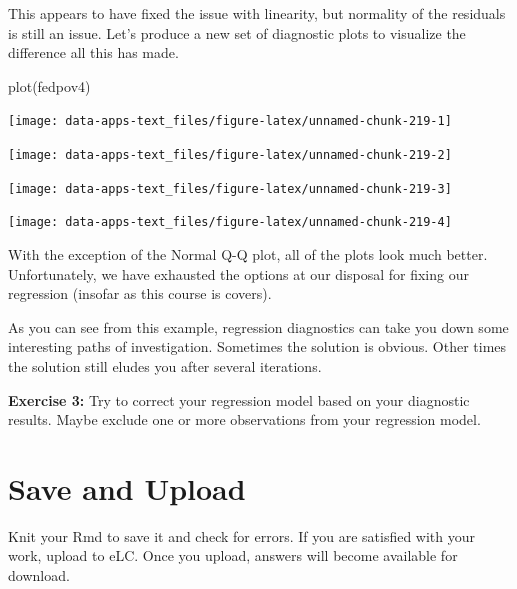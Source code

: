 \documentclass[
]{book}
\makeatletter
\newenvironment{Shaded}{\begin{snugshade}}{\end{snugshade}}
\newcommand{\FunctionTok}[1]{\textcolor[rgb]{0,0,0}{#1}}
\newcommand{\NormalTok}[1]{#1}
\newenvironment{kframe}{%
\medskip{}
\setlength{\fboxsep}{.8em}
 \def\at@end@of@kframe{}%
 \ifinner\ifhmode%
  \def\at@end@of@kframe{\end{minipage}}%
  \begin{minipage}{\columnwidth}%
 \fi\fi%
 \def\FrameCommand##1{\hskip\@totalleftmargin \hskip-\fboxsep
 \colorbox{shadecolor}{##1}\hskip-\fboxsep
     \hskip-\linewidth \hskip-\@totalleftmargin \hskip\columnwidth}%
 \MakeFramed {\advance\hsize-\width
   \@totalleftmargin\z@ \linewidth\hsize
   \@setminipage}}%
 {\par\unskip\endMakeFramed%
 \at@end@of@kframe}
\renewenvironment{Shaded}{\begin{kframe}}{\end{kframe}}
\newenvironment{rmdblock}[1]
  {\begin{shaded*}
  }
  {\end{shaded*}
  }
\newenvironment{learncheck}
  {\begin{rmdblock}{warning}}
  {\end{rmdblock}}
\makeatother
\begin{document}
This appears to have fixed the issue with linearity, but normality of the residuals is still an issue. Let's produce a new set of diagnostic plots to visualize the difference all this has made.

\begin{Shaded}
\begin{Highlighting}[]
\FunctionTok{plot}\NormalTok{(fedpov4)}
\end{Highlighting}
\end{Shaded}

\begin{center}\texttt{[image: data-apps-text\_files/figure-latex/unnamed-chunk-219-1]} \end{center}

\begin{center}\texttt{[image: data-apps-text\_files/figure-latex/unnamed-chunk-219-2]} \end{center}

\begin{center}\texttt{[image: data-apps-text\_files/figure-latex/unnamed-chunk-219-3]} \end{center}

\begin{center}\texttt{[image: data-apps-text\_files/figure-latex/unnamed-chunk-219-4]} \end{center}

With the exception of the Normal Q-Q plot, all of the plots look much better. Unfortunately, we have exhausted the options at our disposal for fixing our regression (insofar as this course is covers).

As you can see from this example, regression diagnostics can take you down some interesting paths of investigation. Sometimes the solution is obvious. Other times the solution still eludes you after several iterations.

\begin{learncheck}
\textbf{Exercise 3:} Try to correct your regression model based on your
diagnostic results. Maybe exclude one or more observations from your
regression model.
\end{learncheck}

\hypertarget{save-and-upload}{%
\section{Save and Upload}\label{save-and-upload}}

Knit your Rmd to save it and check for errors. If you are satisfied with your work, upload to eLC. Once you upload, answers will become available for download.
\end{document}

